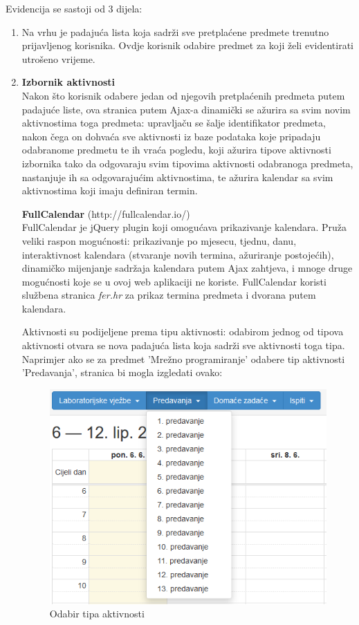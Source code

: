 \documentclass[times, utf8, zavrsni]{fer}
\begin{document}
Evidencija se sastoji od 3 dijela:

\begin{enumerate}[leftmargin=*]
\item Na vrhu je padajuća lista koja sadrži sve pretplaćene predmete trenutno prijavljenog korisnika. Ovdje korisnik odabire predmet za koji želi evidentirati utrošeno vrijeme.

\item \textbf{Izbornik aktivnosti}\\
Nakon što korisnik odabere jedan od njegovih pretplaćenih predmeta putem padajuće liste, ova stranica putem Ajax-a dinamički se ažurira sa svim novim aktivnostima toga predmeta: upravljaču se šalje identifikator predmeta, nakon čega on dohvaća sve aktivnosti iz baze podataka koje pripadaju odabranome predmetu te ih vraća pogledu, koji ažurira tipove aktivnosti izbornika tako da odgovaraju svim tipovima aktivnosti odabranoga predmeta, nastanjuje ih sa odgovarajućim aktivnostima, te ažurira kalendar sa svim aktivnostima koji imaju definiran termin.
\clearpage

\textbf{FullCalendar} (http://fullcalendar.io/)\\
FullCalendar je jQuery plugin koji omogućava prikazivanje kalendara. Pruža veliki raspon mogućnosti: prikazivanje po mjesecu, tjednu, danu, interaktivnost kalendara (stvaranje novih termina, ažuriranje postojećih), dinamičko mijenjanje sadržaja kalendara putem Ajax zahtjeva, i mnoge druge mogućnosti koje se u ovoj web aplikaciji ne koriste. FullCalendar koristi službena stranica \emph{fer.hr} za prikaz termina predmeta i dvorana putem kalendara.

\lstset{style=js}


Aktivnosti su podijeljene prema tipu aktivnosti: odabirom jednog od tipova aktivnosti otvara se nova padajuća lista koja sadrži sve aktivnosti toga tipa. Naprimjer ako se za predmet 'Mrežno programiranje' odabere tip aktivnosti 'Predavanja', stranica bi mogla izgledati ovako:

\begin{figure}[H]
\centering
\includegraphics[scale=0.8]{img/selekcija.png}
\caption{Odabir tipa aktivnosti}
\label{fig:selekcija}
\end{figure}
\clearpage


\end{enumerate}
\end{document}
